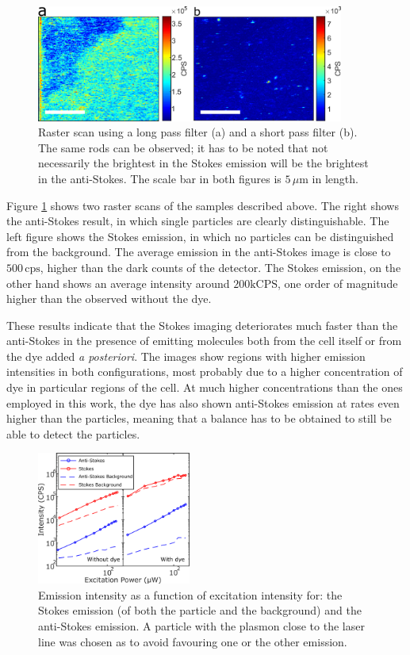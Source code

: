 \documentclass[journal=nalefd,manuscript=letter]{achemso}
\newcommand{\um}{\ensuremath{\,\mu\textrm{m}}}
\newcommand{\CPS}{\ensuremath{\,\textrm{cps}}}
\begin{document}
\begin{figure}[htp]
\centering
	\includegraphics[width=0.9\textwidth]{Figures/05_Stokes_AS_with_dye/stokes_as_with_dye.png}
	\caption{Raster scan using a long pass filter (a) and a short pass filter (b).
	The same rods can be observed; it has to be noted that not necessarily the
	brightest in the Stokes emission will be the brightest in the anti-Stokes. The
	scale bar in both figures is $5\um$ in length.}
	\label{fig:Stokes_AS_with_dye}
\end{figure}

Figure \ref{fig:Stokes_AS_with_dye} shows two raster scans of the samples
described above. The right shows the anti-Stokes result, in which single
particles are clearly distinguishable. The left figure shows the Stokes
emission, in which no particles can be distinguished from the background. The
average emission in the anti-Stokes image is close to $500\CPS$, higher than the
dark counts of the detector. The Stokes emission, on the other hand shows an
average intensity around $200\textrm{kCPS}$, one order of magnitude
higher than the observed without the dye.

These results indicate that the Stokes imaging deteriorates much faster than the
anti-Stokes in the presence of emitting molecules both from the cell itself or
from the dye added \textit{a posteriori}. The images show regions with higher
emission intensities in both configurations, most probably due to a higher concentration
of dye in particular regions of the cell. At much higher concentrations than
the ones employed in this work, the dye has also shown anti-Stokes emission at
rates even higher than the particles, meaning that a balance has to be obtained
to still be able to detect the particles.

\begin{figure}[htp]
\centering
	\includegraphics[width=0.45\textwidth]{Figures/06_Power_Intensity/power_intensity.png}
	\caption{Emission intensity as a function of excitation intensity for: the
	Stokes emission (of both the particle and the background) and the anti-Stokes
	emission. A particle with the plasmon close to the laser line was chosen as to
	avoid favouring one or the other emission.}
	\label{fig:power_intensity}
\end{figure}
\end{document}
